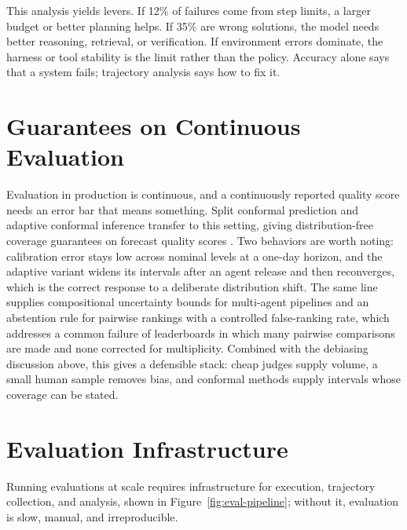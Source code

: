 \documentclass[11pt]{book}
\begin{document}
This analysis yields levers. If 12\% of failures come from step limits, a larger budget or better planning helps. If 35\% are wrong solutions, the model needs better reasoning, retrieval, or verification. If environment errors dominate, the harness or tool stability is the limit rather than the policy. Accuracy alone says that a system fails; trajectory analysis says how to fix it.

\section{Guarantees on Continuous Evaluation}

Evaluation in production is continuous, and a continuously reported quality score needs an error bar that means something. Split conformal prediction and adaptive conformal inference transfer to this setting, giving distribution-free coverage guarantees on forecast quality scores \cite{conformaleval2026}. Two behaviors are worth noting: calibration error stays low across nominal levels at a one-day horizon, and the adaptive variant widens its intervals after an agent release and then reconverges, which is the correct response to a deliberate distribution shift. The same line supplies compositional uncertainty bounds for multi-agent pipelines and an abstention rule for pairwise rankings with a controlled false-ranking rate, which addresses a common failure of leaderboards in which many pairwise comparisons are made and none corrected for multiplicity. Combined with the debiasing discussion above, this gives a defensible stack: cheap judges supply volume, a small human sample removes bias, and conformal methods supply intervals whose coverage can be stated.

\section{Evaluation Infrastructure}

Running evaluations at scale requires infrastructure for execution, trajectory collection, and analysis, shown in Figure~\ref{fig:eval-pipeline}; without it, evaluation is slow, manual, and irreproducible.
\end{document}
